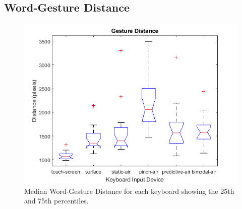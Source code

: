 \subsection{Word-Gesture Distance}
\begin{figure}[h]
	\centering
	\includegraphics{fig_distance_boxplot}
	\caption[Word-Gesture Distance Boxplot]{Median Word-Gesture Distance for each keyboard showing the 25th and 75th percentiles.}
	\label{fig_distance_boxplot}
\end{figure}


